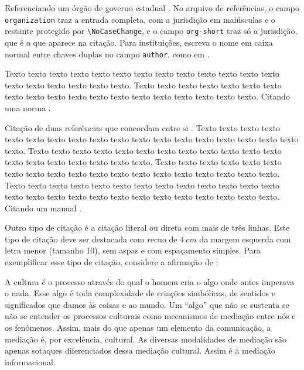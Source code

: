     Referenciando um órgão de governo estadual \cite{secretaria1999}. No arquivo de referências, o campo \verb=organization= traz a entrada completa, com a jurisdição em maiúsculas e o restante protegido por \verb=\NoCaseChange=, e o campo \verb=org-short= traz só a jurisdição, que é o que aparece na citação. Para instituições, escreva o nome em caixa normal entre chaves duplas no campo \verb=author=, como em .
    
    Texto texto texto texto texto texto texto texto texto texto texto texto texto texto texto texto texto texto texto. Texto texto texto texto texto texto texto texto texto texto texto texto texto texto texto texto texto texto texto. Citando uma norma \cite{NBR10520:2023}.
        
    Citação de duas referências que concordam entre si \cite{Almeida2018,Gondim2017}. Texto texto texto texto texto texto texto texto texto texto texto texto texto texto texto texto texto texto texto. Texto texto texto texto texto texto texto texto texto texto texto texto texto texto texto texto texto texto texto. Texto texto texto texto texto texto texto texto texto texto texto texto texto texto texto texto texto texto texto. Texto texto texto texto texto texto texto texto texto texto texto texto texto texto texto texto texto texto texto texto texto texto texto texto texto texto. Citando um manual \cite{manuais1989}. 
        
    Outro tipo de citação é a citação literal ou direta com mais de três linhas. Este tipo de citação deve ser destacada com recuo de $4~cm$ da margem esquerda com letra menor (tamanho 10), sem aspas e com espaçamento simples.  Para exemplificar esse tipo de citação, considere a afirmação de :
    \begin{citacao}
        A cultura é o processo através do qual o homem cria o algo onde antes imperava o nada. Esse algo é toda complexidade de criações simbólicas, de sentidos e significados que damos às coisas e ao mundo. Um ``algo'' que não se sustenta se não se entender os processos culturais como mecanismos de mediação entre nós e os fenômenos. Assim, mais do que apenas um elemento da comunicação, a mediação é, por excelência, cultural. As diversas modalidades de mediação são apenas sotaques diferenciados dessa mediação cultural. Assim é a mediação informacional.
    \end{citacao}
        
